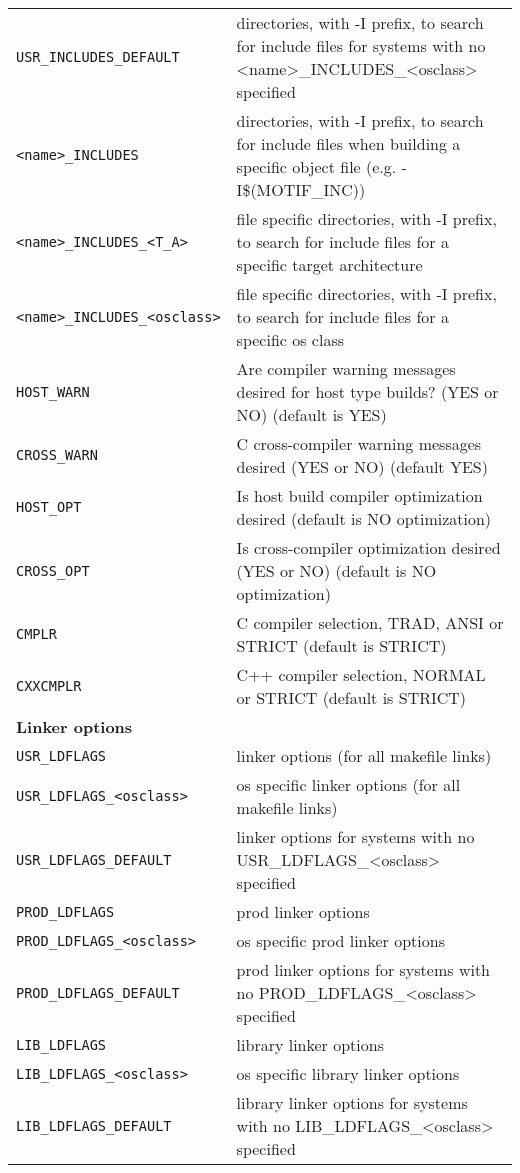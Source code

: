 \begin{center}
\begin{longtable}{p{2.94784in}p{3.76247in}}
\verb|USR_INCLUDES_DEFAULT| & directories, with -I prefix, to search for include files for systems with no \textless{}name\textgreater{}\_INCLUDES\_\textless{}osclass\textgreater{} specified\\
\verb|<name>_INCLUDES| & directories, with -I prefix, to search for include files when building a specific object file (e.g. -I\$(MOTIF\_INC))\\
\verb|<name>_INCLUDES_<T_A>| & file specific directories, with -I prefix, to search for include files for a specific target architecture\\
\verb|<name>_INCLUDES_<osclass>| & file specific directories, with -I prefix, to search for include files for a specific os class\\
\verb|HOST_WARN| & Are compiler warning messages desired for host type builds? (YES or NO) (default is YES)\\
\verb|CROSS_WARN| & C cross-compiler warning messages desired (YES or NO) (default YES)\\
\verb|HOST_OPT| & Is host build compiler optimization desired (default is NO optimization)\\
\verb|CROSS_OPT| & Is cross-compiler optimization desired (YES or NO) (default is NO optimization)\\
\verb|CMPLR| & C compiler selection, TRAD, ANSI or STRICT (default is STRICT)\\
\verb|CXXCMPLR| & C++ compiler selection, NORMAL or STRICT (default is STRICT)\\
\textbf{Linker options} &    \\
\verb|USR_LDFLAGS| & linker options (for all makefile links)\\
\verb|USR_LDFLAGS_<osclass>| & os specific linker options (for all makefile links)\\
\verb|USR_LDFLAGS_DEFAULT| & linker options for systems with no USR\_LDFLAGS\_\textless{}osclass\textgreater{} specified\\
\verb|PROD_LDFLAGS| & prod linker options\\
\verb|PROD_LDFLAGS_<osclass>| & os specific prod linker options\\
\verb|PROD_LDFLAGS_DEFAULT| & prod linker options for systems with no PROD\_LDFLAGS\_\textless{}osclass\textgreater{} specified\\
\verb|LIB_LDFLAGS| & library linker options\\
\verb|LIB_LDFLAGS_<osclass>| & os specific library linker options\\
\verb|LIB_LDFLAGS_DEFAULT| & library linker options for systems with no LIB\_LDFLAGS\_\textless{}osclass\textgreater{} specified\\

\end{longtable}
\end{center}
